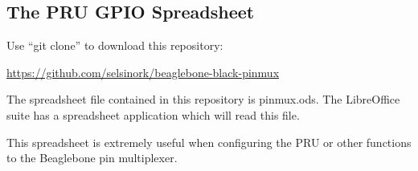 \subsection{The PRU GPIO Spreadsheet}

Use ``git clone'' to download this repository:

\url{https://github.com/selsinork/beaglebone-black-pinmux}

The spreadsheet file contained in this repository is pinmux.ods.
The LibreOffice suite has a spreadsheet application which will read
this file.

This spreadsheet is extremely useful when configuring the PRU or
other functions to the Beaglebone pin multiplexer.



